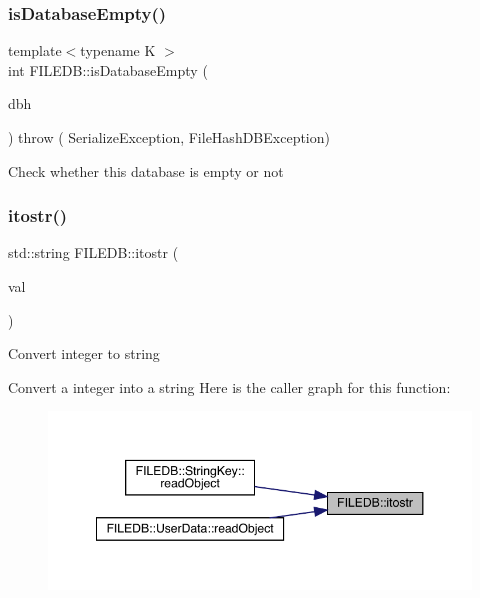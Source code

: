 \subsubsection{\texorpdfstring{isDatabaseEmpty()}{isDatabaseEmpty()}}
{\footnotesize\ttfamily template$<$typename K $>$ \\
int F\+I\+L\+E\+D\+B\+::is\+Database\+Empty (\begin{DoxyParamCaption}\item[{\mbox{\hyperlink{other__libs_2filedb_2filehash_2ffdb__db_8h_a0b27b956926453a7a8141ea8e10f0df8}{F\+F\+D\+B\+\_\+\+DB}} $\ast$}]{dbh }\end{DoxyParamCaption}) throw ( Serialize\+Exception, File\+Hash\+D\+B\+Exception) }

Check whether this database is empty or not \mbox{\label{namespaceFILEDB_a00ba2326eea8f8eb8dc3b4be5eac2bf3}} 
\subsubsection{\texorpdfstring{itostr()}{itostr()}}
{\footnotesize\ttfamily std\+::string F\+I\+L\+E\+D\+B\+::itostr (\begin{DoxyParamCaption}\item[{int}]{val }\end{DoxyParamCaption})}

Convert integer to string

Convert a integer into a string Here is the caller graph for this function\+:\nopagebreak
\begin{figure}[H]
\begin{center}
\leavevmode
\includegraphics[width=348pt]{d2/de6/namespaceFILEDB_a00ba2326eea8f8eb8dc3b4be5eac2bf3_icgraph}
\end{center}
\end{figure}
\mbox{\label{namespaceFILEDB_a3533131675008d2c3b9b3d1685b2e679}} 
